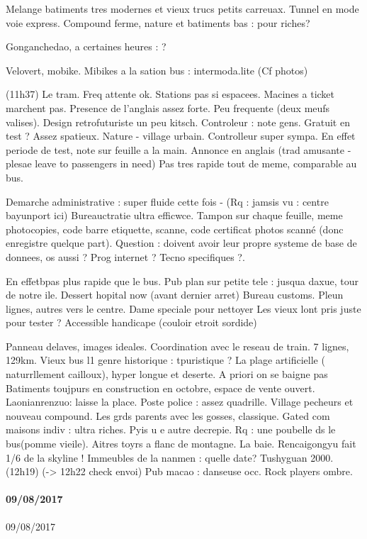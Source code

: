 Melange batiments tres modernes et vieux trucs petits carreuax.
Tunnel en mode voie express. Compound ferme, nature et batiments bas : pour riches?

Gonganchedao, a certaines heures : ?

Velovert, mobike.
Mibikes a la sation bus : intermoda.lite
(Cf photos)


(11h37)
Le tram. Freq attente ok. Stations pas si espacees. Macines a ticket marchent pas. Presence de l'anglais assez forte.
Peu frequente (deux meufs valises).
Design retrofuturiste un peu kitsch.
Controleur : note gens. Gratuit en test ?
Assez spatieux.
Nature - village urbain.
Controlleur super sympa. En effet periode de test, note sur feuille a la main.
Annonce en anglais (trad amusante - plesae leave to passengers in need)
Pas tres rapide tout de meme, comparable au bus.

Demarche administrative : super fluide cette fois -
(Rq : jamsis vu : centre bayunport ici)
Bureauctratie ultra efficwce. Tampon sur chaque feuille, meme photocopies, code barre etiquette, scanne, code certificat photos scanné (donc enregistre quelque part). Question : doivent avoir leur propre systeme de base de donnees, os aussi ? Prog internet ? Tecno specifiques ?.

En effetbpas plus rapide que le bus.
Pub plan sur petite tele : jusqua daxue, tour de notre ile.
Dessert hopital now (avant dernier arret)
Bureau customs.
Pleun lignes, autres vers le centre.
Dame speciale pour nettoyer
Les vieux lont pris juste pour tester ?
Accessible handicape (couloir etroit sordide)

Panneau delaves, images ideales.
Coordination avec le reseau de train.
7 lignes, 129km.
Vieux bus l1 genre historique : tpuristique ?
La plage artificielle ( naturrllement cailloux), hyper longue et deserte. A priori on se baigne pas
Batiments toujpurs en construction en octobre, espace de vente ouvert.
Laonianrenzuo: laisse la place.
Poste police : assez quadrille. Village pecheurs et nouveau compound.
Les grds parents avec les gosses, classique.
Gated com maisons indiv : ultra riches. Pyis u e autre decrepie.
Rq : une poubelle ds le bus(pomme vieile).
Aitres toyrs a flanc de montagne.
La baie. Rencaigongyu fait 1/6 de la skyline !
Immeubles de la nanmen : quelle date? Tushyguan 2000.
(12h19)
(-> 12h22 check envoi)
Pub macao : danseuse occ. Rock players ombre.





\paragraph{09/08/2017}{09/08/2017}

